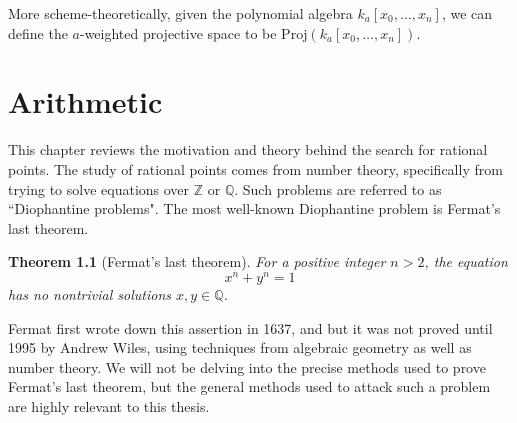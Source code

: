 \documentclass[12pt,twoside]{reedthesis}
\theoremstyle{plain}
\newtheorem{theorem}{Theorem}[chapter]
\theoremstyle{definition}
\theoremstyle{remark}
\newcommand{\ZZ}{\mathbb{Z}}
\newcommand{\QQ}{\mathbb{Q}}
\begin{document}
More scheme-theoretically, given the polynomial algebra $k_a[x_0,\ldots,x_n]$, we can define the $a$-weighted projective space to be $\text{Proj}(k_a[x_0,\ldots,x_n])$.
\chapter{Arithmetic}
This chapter reviews the motivation and theory behind the search for rational points. The study of rational points comes from number theory, specifically from trying to solve equations over $\ZZ$ or $\QQ$. Such problems are referred to as ``Diophantine problems". The most well-known Diophantine problem is Fermat's last theorem.
\begin{theorem}[Fermat's last theorem]
For a positive integer $n>2$, the equation \[x^n+y^n=1\] has no nontrivial solutions $x,y\in\QQ$.
\end{theorem}
\noindent Fermat first wrote down this assertion in 1637, and but it was not proved until 1995 by Andrew Wiles, using techniques from algebraic geometry as well as number theory. We will not be delving into the precise methods used to prove Fermat's last theorem, but the general methods used to attack such a problem are highly relevant to this thesis.
\end{document}

